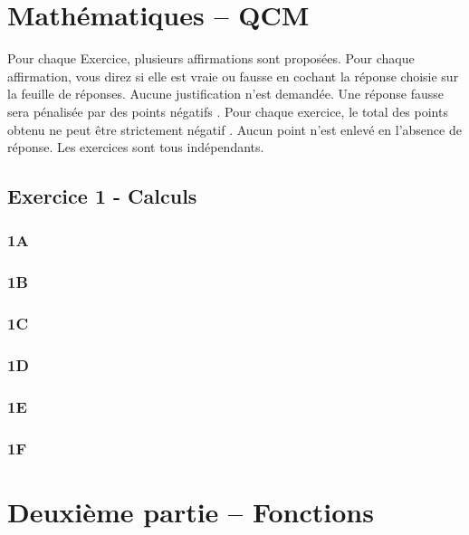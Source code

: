 \documentclass[a4paper,14pt]{extarticle} %
\begin{document}
 



\section{Mathématiques – QCM}

Pour chaque Exercice, plusieurs affirmations sont proposées. Pour chaque affirmation, vous direz si elle est
vraie ou fausse en cochant la réponse choisie sur la feuille de réponses.
Aucune justification n’est demandée.
Une réponse fausse sera pénalisée par des points négatifs .
Pour chaque exercice, le total des points obtenu ne peut être strictement négatif .
Aucun point n’est enlevé en l’absence de réponse.
Les exercices sont tous indépendants.



\subsection{Exercice 1 - Calculs}


\subsubsection{1A}

\subsubsection{1B}

\subsubsection{1C}


\subsubsection{1D}


\subsubsection{1E}


\subsubsection{1F}



\section{Deuxième partie – Fonctions}
\end{document}
